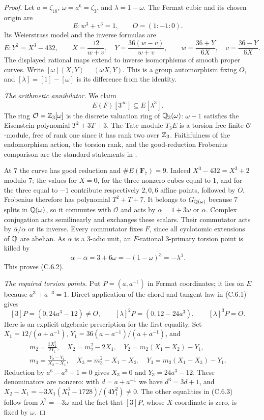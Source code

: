 \begin{proof}
Let $a=\zeta_{18}$, $\omega=a^6=\zeta_3$, and $\lambda=1-\omega$.
The Fermat cubic and its chosen origin are
\[
 E:w^3+v^3=1,\qquad O=(1:-1:0).
\]
Its Weierstrass model and the inverse formulas are
\[
 E:Y^2=X^3-432,\qquad
 X=\frac{12}{w+v},\quad Y=\frac{36(w-v)}{w+v},
 \qquad
 w=\frac{36+Y}{6X},\quad v=\frac{36-Y}{6X}.
 \tag{C.6.1}
\]
The displayed rational maps extend to inverse isomorphisms of
smooth proper curves. Write $[\omega](X,Y)=(\omega X,Y)$.
This is a group automorphism fixing $O$, and
$[\lambda]=[1]-[\omega]$ is its difference from the identity.

\emph{The arithmetic annihilator.}
We claim
\[
 E(F)[3^\infty]\subseteq E[\lambda^3].
 \tag{C.6.2}
\]
The ring $\mathcal O=\mathbb Z_3[\omega]$ is the discrete valuation ring
of $\mathbb Q_3(\omega)$: $\omega-1$ satisfies the Eisenstein polynomial
$T^2+3T+3$. The Tate module $T_3E$ is a torsion-free finite
$\mathcal O$-module, free of rank one since it has rank two over
$\mathbb Z_3$. Faithfulness of the endomorphism action, the torsion rank,
and the good-reduction Frobenius comparison are the standard
statements in \cite[II, Propositions 6.3, 6.4, 6.7; V,
Propositions 8.1, 8.3]{AgentMilneEC}.

At $7$ the curve has good reduction and $\#E(\mathbf F_7)=9$.
Indeed $X^3-432=X^3+2$ modulo $7$; the values for $X=0$, for
the three nonzero cubes equal to $1$, and for the three equal to
$-1$ contribute respectively $2,0,6$ affine points, followed by
$O$. Frobenius therefore has polynomial $T^2+T+7$.
It belongs to $G_{\mathbb Q(\omega)}$ because $7$ splits in
$\mathbb Q(\omega)$, so it commutes with $\mathcal O$ and acts by
$\alpha=1+3\omega$ or $\bar\alpha$. Complex conjugation acts
semilinearly and exchanges these scalars. Their commutator acts
by $\bar\alpha/\alpha$ or its inverse. Every commutator fixes
$F$, since all cyclotomic extensions of $\mathbb Q$ are abelian.
As $\alpha$ is a $3$-adic unit, an $F$-rational $3$-primary
torsion point is killed by
\[
 \alpha-\bar\alpha=3+6\omega=-(1-\omega)^3=-\lambda^3.
\]
This proves (C.6.2).

\emph{The required torsion points.}
Put $P=(a,a^{-1})$ in Fermat coordinates; it lies on $E$ because
$a^3+a^{-3}=1$. Direct application of the chord-and-tangent law
in (C.6.1) gives
\[
 [3]P=(0,24a^3-12)\ne O,\qquad
 [\lambda]^2P=(0,12-24a^3),\qquad [\lambda]^3P=O.
 \tag{C.6.3}
\]
Here is an explicit algebraic prescription for the first equality.
Set $X_1=12/(a+a^{-1})$, $Y_1=36(a-a^{-1})/(a+a^{-1})$, and
\[
 \begin{gathered}
 m_2=\frac{3X_1^2}{2Y_1},\quad
 X_2=m_2^2-2X_1,\quad Y_2=m_2(X_1-X_2)-Y_1,\\
 m_3=\frac{Y_2-Y_1}{X_2-X_1},\quad
 X_3=m_3^2-X_1-X_2,\quad Y_3=m_3(X_1-X_3)-Y_1.
 \end{gathered}
\]
Reduction by $a^6-a^3+1=0$ gives $X_3=0$ and
$Y_3=24a^3-12$. These denominators are nonzero: with
$d=a+a^{-1}$ we have $d^3=3d+1$, and
$X_2-X_1=-3X_1(X_1^3-1728)/(4Y_1^2)\ne0$.
The other equalities in (C.6.3) follow from
$\lambda^2=-3\omega$ and the fact that $[3]P$, whose
$X$-coordinate is zero, is fixed by $\omega$.


\end{proof}
